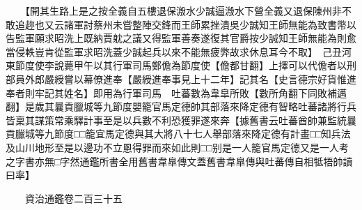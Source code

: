 　　【開其生路上是之按全義自五樓退保溵水少誠逼溵水下營全義又退保陳州非不敢追趂也又云諸軍討蔡州未嘗整陣交鋒而王師累挫潰吳少誠知王師無能為致書幣以告監軍願求昭洗上既納賈躭之議又得監軍善奏遂復其官爵按少誠知王師無能為則愈當侵軼豈肯從監軍求昭洗蓋少誠起兵以來不能無疲弊故求休息耳今不取】　己丑河東節度使李說薨甲午以其行軍司馬鄭儋為節度使【儋都甘翻】上擇可以代儋者以刑部員外郎嚴綬嘗以幕僚進奉【嚴綬進奉事見上十二年】記其名【史言德宗好貨惟進奉者則牢記其姓名】即用為行軍司馬　吐蕃數為韋臯所敗【數所角翻下同敗補邁翻】是歲其曩貢臘城等九節度嬰籠官馬定德帥其部落來降定德有智略吐蕃諸將行兵皆稟其謀策常乘驛計事至是以兵數不利恐獲罪遂來奔【據舊書云吐蕃酋帥兼監統曩貢臘城等九節度□□籠宜馬定德與其大將八十七人舉部落來降定德有計畫□□知兵法及山川地形至是以邊功不立慁得罪而來如此則□□别是一人籠官馬定德又是一人考之字書亦無□字然通鑑所書全用舊書韋臯傳文蓋舊書韋臯傳與吐蕃傳自相牴牾帥讀曰率】

　　資治通鑑卷二百三十五  
    


 


 



 

 
  







 


　　
　　
　
　
　


　　

　















	
	









































